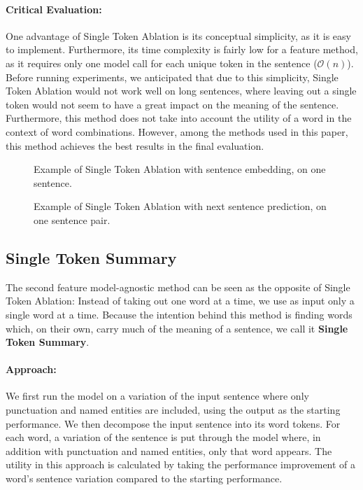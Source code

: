 \paragraph{Critical Evaluation:}
One advantage of Single Token Ablation is its conceptual simplicity, as it is easy to implement.
Furthermore, its time complexity is fairly low for a feature method, as it requires only one model call for each unique token in the sentence ($\mathcal{O}(n)$).
Before running experiments, we anticipated that due to this simplicity, Single Token Ablation would not work well on long sentences, where leaving out a single token would not seem to have a great impact on the meaning of the sentence.
Furthermore, this method does not take into account the utility of a word in the context of word combinations.
However, among the methods used in this paper, this method achieves the best results in the final evaluation.

\begin{figure}[H]
	
	\caption{Example of Single Token Ablation with sentence embedding, on one sentence.}
	\label{fig:single-token-ablation-sentemb}
\end{figure}

\begin{figure}[H]
	
	\caption{Example of Single Token Ablation with next sentence prediction, on one sentence pair.}
	\label{fig:single-token-ablation-nsp}
\end{figure}

\subsection{Single Token Summary}
The second feature model-agnostic method can be seen as the opposite of Single Token Ablation:
Instead of taking out one word at a time, we use as input only a single word at a time.
Because the intention behind this method is finding words which, on their own, carry much of the meaning of a sentence, we call it \textbf{Single Token Summary}.

\paragraph{Approach:}
We first run the model on a variation of the input sentence where only punctuation and named entities are included, using the output as the starting performance.
We then decompose the input sentence into its word tokens.
For each word, a variation of the sentence is put through the model where, in addition with punctuation and named entities, only that word appears.
The utility in this approach is calculated by taking the performance improvement of a word's sentence variation compared to the starting performance.

